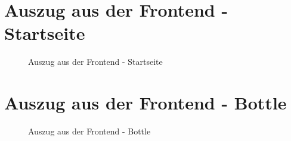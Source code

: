 \begin{landscape}
	\vspace*{1cm}
	\section{Auszug aus der Frontend - Startseite} \label{a.2.frontend}
	\begin{figure}[h]
		\centering
		\caption{Auszug aus der Frontend - Startseite}
		\label{2.frontend}
	\end{figure}
	
	\newpage
	
	\vspace*{1cm}
	\section{Auszug aus der Frontend - Bottle} \label{a.2.frontend.bottles}
	\begin{figure}[h]
		\centering
		\caption{Auszug aus der Frontend - Bottle}
		\label{2.frontend}
	\end{figure}

\end{landscape}


\newpage